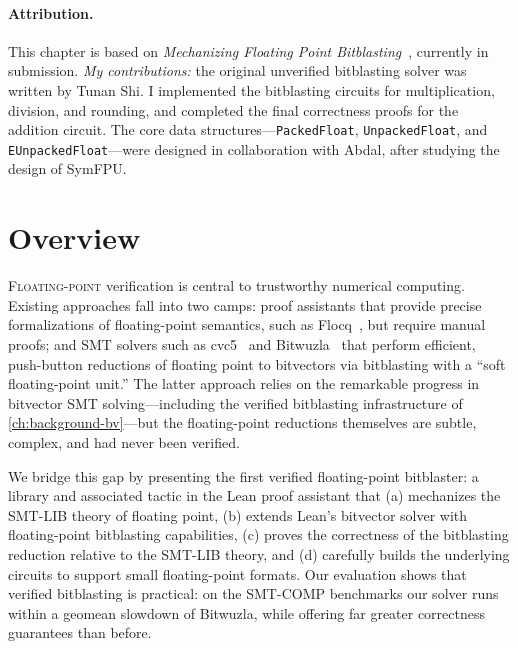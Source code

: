 
\paragraph*{Attribution.} This chapter is based on \emph{Mechanizing Floating
Point Bitblasting}~\citep{bhat2027floatingpoint}, currently in submission.
\emph{My contributions:} the original unverified bitblasting solver was written
by Tunan Shi. I implemented the bitblasting circuits for multiplication,
division, and rounding, and completed the final correctness proofs for the
addition circuit. The core data structures---\texttt{PackedFloat},
\texttt{UnpackedFloat}, and \texttt{EUnpackedFloat}---were designed in
collaboration with Abdal, after studying the design of SymFPU.

\section{Overview}
\label{sec:fp:chapter-overview}

\lettrine{F}{loating-point} verification is central to trustworthy numerical
computing. Existing approaches fall into two camps: proof assistants that
provide precise formalizations of floating-point semantics, such as
Flocq~\citep{boldo2011flocq}, but require manual proofs; and SMT solvers such
as cvc5~\citep{barbosa2022cvc5} and Bitwuzla~\citep{niemetz2023bitwuzla} that
perform efficient, push-button reductions of floating point to bitvectors via
bitblasting with a ``soft floating-point unit.'' The latter approach relies
on the remarkable progress in bitvector SMT solving---including the verified
bitblasting infrastructure of \cref{ch:background-bv}---but the floating-point
reductions themselves are subtle, complex, and had never been verified.

We bridge this gap by presenting the first verified floating-point bitblaster:
a library and associated tactic in the Lean proof assistant that
(a) mechanizes the SMT-LIB theory of floating point,
(b) extends Lean's bitvector solver with floating-point bitblasting capabilities,
(c) proves the correctness of the bitblasting reduction relative to the SMT-LIB theory, and
(d) carefully builds the underlying circuits to support small floating-point formats.
Our evaluation shows that verified bitblasting is practical:
on the SMT-COMP benchmarks our solver runs within a \SmtLibGeomeanTimeElapsedRatioOB{} geomean slowdown of Bitwuzla,
while offering far greater correctness guarantees than before.

